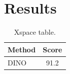 \documentclass{article}
\newcommand{\dino}{DINO\xspace}
\begin{document}
\section{Results}
\begin{table}
\centering
\caption{Xspace table.}
\label{tab:xspace}
\begin{tabular}{lc}
\toprule
Method & Score \\
\midrule
\dino & 91.2 \\
\bottomrule
\end{tabular}
\end{table}
\end{document}
